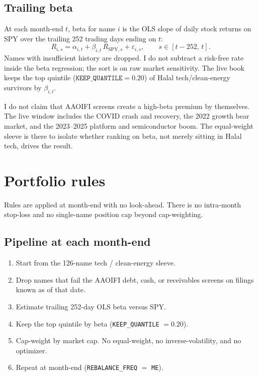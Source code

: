 \documentclass[11pt,letterpaper]{article}
\begin{document}
\subsection{Trailing beta}

At each month-end $t$, beta for name $i$ is the OLS slope of daily stock returns on SPY over the trailing 252 trading days ending on $t$:
\[
R_{i,s} = \alpha_{i,t} + \beta_{i,t}\, R_{\mathrm{SPY},s} + \varepsilon_{i,s},
\qquad s \in [t-252,\, t].
\]
Names with insufficient history are dropped. I do not subtract a risk-free rate inside the beta regression; the sort is on raw market sensitivity. The live book keeps the top quintile ($\texttt{KEEP\_QUANTILE}=0.20$) of Halal tech/clean-energy survivors by $\beta_{i,t}$.

I do not claim that AAOIFI screens create a high-beta premium by themselves. The live window includes the COVID crash and recovery, the 2022 growth bear market, and the 2023--2025 platform and semiconductor boom. The equal-weight sleeve is there to isolate whether ranking on beta, not merely sitting in Halal tech, drives the result.

\section{Portfolio rules}
\label{sec:rules}

Rules are applied at month-end with no look-ahead. There is no intra-month stop-loss and no single-name position cap beyond cap-weighting.

\subsection{Pipeline at each month-end}

\begin{enumerate}
  \item Start from the 126-name tech / clean-energy sleeve.
  \item Drop names that fail the AAOIFI debt, cash, or receivables screens on filings known as of that date.
  \item Estimate trailing 252-day OLS beta versus SPY.
  \item Keep the top quintile by beta (\texttt{KEEP\_QUANTILE} $= 0.20$).
  \item Cap-weight by market cap. No equal-weight, no inverse-volatility, and no optimizer.
  \item Repeat at month-end (\texttt{REBALANCE\_FREQ} $=$ \texttt{ME}).
\end{enumerate}
\end{document}
